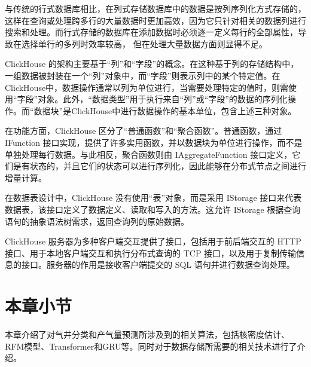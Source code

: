 与传统的行式数据库相比，在列式存储数据库中的数据是按列序列化方式存储的，这样在查询或处理跨多行的大量数据时更加高效\cite{dwivedi2012performance}，因为它只针对相关的数据列进行搜索和处理。而行式存储的数据库在添加数据时必须逐一定义每行的全部属性，导致在选择单行的多列时效率较高，
但在处理大量数据方面则显得不足。

ClickHouse 的架构主要基于“列”和“字段”的概念。在这种基于列的存储结构中，一组数据被封装在一个“列”对象中，而“字段”则表示列中的某个特定值。在ClickHouse中，数据操作通常以列为单位进行，当需要处理特定的值时，则需使用“字段”对象。此外，“数据类型”用于执行来自“列”或“字段”的数据的序列化操作。而“数据块”是ClickHouse中进行数据操作的基本单位，包含上述三种对象。

在功能方面，ClickHouse 区分了“普通函数”和“聚合函数”。普通函数，通过 IFunction 接口实现，提供了许多实用函数，并以数据块为单位进行操作，而不是单独处理每行数据。与此相反，聚合函数则由 IAggregateFunction 接口定义，它们是有状态的，并且它们的状态可以进行序列化，因此能够在分布式节点之间进行增量计算。

在数据表设计中，ClickHouse 没有使用“表”对象，而是采用 IStorage 接口来代表数据表，该接口定义了数据定义、读取和写入的方法。这允许 IStorage 根据查询语句的抽象语法树需求，返回查询列的原始数据。

ClickHouse 服务器为多种客户端交互提供了接口，包括用于前后端交互的 HTTP 接口、用于本地客户端交互和执行分布式查询的 TCP 接口，以及用于复制传输信息的接口。服务器的作用是接收客户端提交的 SQL 语句并进行数据查询处理。
\section{本章小节}
本章介绍了对气井分类和产气量预测所涉及到的相关算法，包括核密度估计、RFM模型、Transformer和GRU等。同时对于数据存储所需要的相关技术进行了介绍。